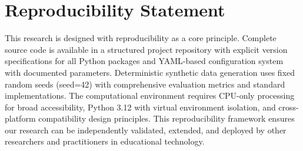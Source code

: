\documentclass{article}
\begin{document}
\section*{Reproducibility Statement}
This research is designed with reproducibility as a core principle. Complete source code is available in a
structured project repository with explicit version specifications for all Python packages and YAML-based
configuration system with documented parameters. Deterministic synthetic data generation uses fixed random
seeds (seed=42) with comprehensive evaluation metrics and standard implementations. The computational
environment requires CPU-only processing for broad accessibility, Python 3.12 with virtual environment
isolation, and cross-platform compatibility design principles. This reproducibility framework ensures our
research can be independently validated, extended, and deployed by other researchers and practitioners in
educational technology.
\end{document}

